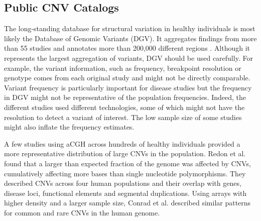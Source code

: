 \subsection{Public CNV Catalogs}
The long-standing database for structural variation in healthy individuals is most likely the Database of Genomic Variants (DGV).
It aggregates findings from more than 55 studies and annotates more than 200,000 different regions \cite{Zarrei2015}.
Although it represents the largest aggregation of variants, DGV should be used carefully.
For example, the variant information, such as frequency, breakpoint resolution or genotype comes from each original study and might not be directly comparable.
Variant frequency is particularly important for disease studies but the frequency in DGV might not be representative of the population frequencies.
Indeed, the different studies used different technologies, some of which might not have the resolution to detect a variant of interest.
The low sample size of some studies might also inflate the frequency estimates.

A few studies using aCGH across hundreds of healthy individuals provided a more representative distribution of large CNVs in the population.
Redon et al. found that a larger than expected fraction of the genome was affected by CNVs, cumulatively affecting more bases than single nucleotide polymorphisms\cite{Redon2006}.
They described CNVs across four human populations and their overlap with genes, disease loci, functional elements and segmental duplications.
Using arrays with higher density and a larger sample size, Conrad et al. described similar patterns for common and rare CNVs in the human genome\cite{Conrad2010}.

